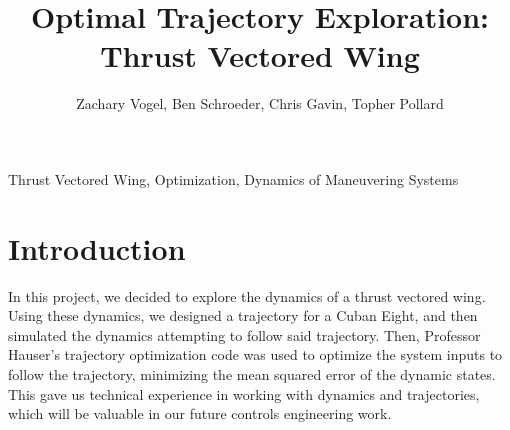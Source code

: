 \documentclass[journal]{IEEEtran}
\begin{document}
\title{Optimal Trajectory Exploration: Thrust Vectored Wing}
\author{Zachary Vogel, Ben Schroeder, Chris Gavin, Topher Pollard}

\maketitle


\begin{IEEEkeywords}
    Thrust Vectored Wing, Optimization, Dynamics of Maneuvering Systems
\end{IEEEkeywords}

\section{Introduction}
In this project, we decided to explore the dynamics of a thrust vectored wing. Using these dynamics, we designed a trajectory for a Cuban Eight, and then simulated the dynamics attempting to follow said trajectory. Then, Professor Hauser's trajectory optimization code was used to optimize the system inputs to follow the trajectory, minimizing the mean squared error of the dynamic states. This gave us technical experience in working with dynamics and trajectories, which will be valuable in
our future controls engineering work.
\end{document}
